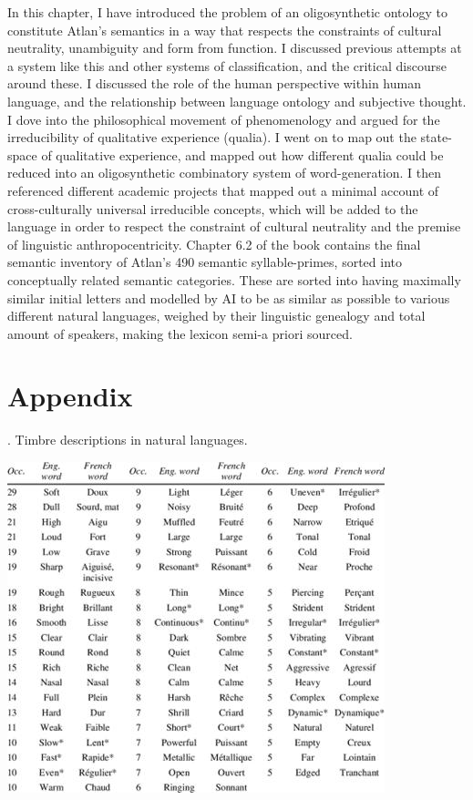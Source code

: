 In this chapter, I have introduced the problem of an oligosynthetic ontology to constitute Atlan’s semantics in a way that respects the constraints of cultural neutrality, unambiguity and form from function. I discussed previous attempts at a system like this and other systems of classification, and the critical discourse around these. I discussed the role of the human perspective within human language, and the relationship between language ontology and subjective thought. I dove into the philosophical movement of phenomenology and argued for the irreducibility of qualitative experience (qualia). I went on to map out the state-space of qualitative experience, and mapped out how different qualia could be reduced into an oligosynthetic combinatory system of word-generation. I then referenced different academic projects that mapped out a minimal account of cross-culturally universal irreducible concepts, which will be added to the language in order to respect the constraint of cultural neutrality and the premise of linguistic anthropocentricity. Chapter 6.2 of the book contains the final semantic inventory of Atlan’s 490 semantic syllable-primes, sorted into conceptually related semantic categories. These are sorted into having maximally similar initial letters and modelled by AI to be as similar as possible to various different natural languages, weighed by their linguistic genealogy and total amount of speakers, making the lexicon semi-a priori sourced. 


\section{Appendix}
. Timbre descriptions in natural languages.

\begin{center}
	\includegraphics[scale=0.6]{./Images/timbre.jpg}
\end{center}



